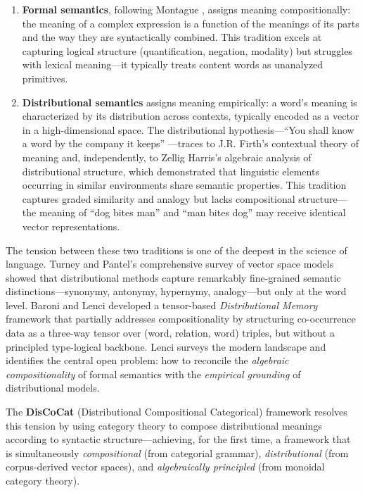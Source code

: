 \documentclass[
]{article}
\numberwithin{equation}{section}
\begin{document}
\begin{enumerate}
\def\labelenumi{\arabic{enumi}.}
\item
  \textbf{Formal semantics}, following Montague
  \citeyearpar{montague1973proper}, assigns meaning compositionally: the
  meaning of a complex expression is a function of the meanings of its
  parts and the way they are syntactically combined. This tradition
  excels at capturing logical structure (quantification, negation,
  modality) but struggles with lexical meaning---it typically treats
  content words as unanalyzed primitives.
\item
  \textbf{Distributional semantics} assigns meaning empirically: a
  word's meaning is characterized by its distribution across contexts,
  typically encoded as a vector in a high-dimensional space. The
  distributional hypothesis---``You shall know a word by the company it
  keeps'' \citep{firth1957papers}---traces to J.R. Firth's contextual
  theory of meaning and, independently, to Zellig Harris's
  \citeyearpar{harris1954distributional} algebraic analysis of
  distributional structure, which demonstrated that linguistic elements
  occurring in similar environments share semantic properties. This
  tradition captures graded similarity and analogy but lacks
  compositional structure---the meaning of ``dog bites man'' and ``man
  bites dog'' may receive identical vector representations.
\end{enumerate}

The tension between these two traditions is one of the deepest in the
science of language. Turney and Pantel's
\citeyearpar{turney2010frequency} comprehensive survey of vector space
models showed that distributional methods capture remarkably
fine-grained semantic distinctions---synonymy, antonymy, hypernymy,
analogy---but only at the word level. Baroni and Lenci
\citeyearpar{baroni2010distributional} developed a tensor-based
\emph{Distributional Memory} framework that partially addresses
compositionality by structuring co-occurrence data as a three-way tensor
over (word, relation, word) triples, but without a principled
type-logical backbone. Lenci \citeyearpar{lenci2018distributional}
surveys the modern landscape and identifies the central open problem:
how to reconcile the \emph{algebraic compositionality} of formal
semantics with the \emph{empirical grounding} of distributional models.

The \textbf{DisCoCat} (Distributional Compositional Categorical)
framework \citep{coecke2010mathematical} resolves this tension by using
category theory to compose distributional meanings according to
syntactic structure---achieving, for the first time, a framework that is
simultaneously \emph{compositional} (from categorial grammar),
\emph{distributional} (from corpus-derived vector spaces), and
\emph{algebraically principled} (from monoidal category theory).
\end{document}
